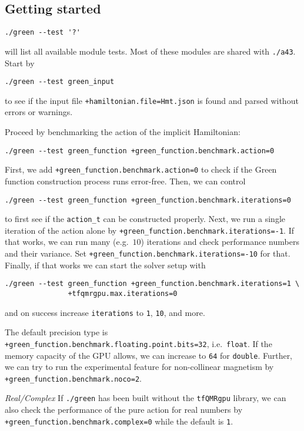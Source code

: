 \documentclass[oribibl]{llncs}
\newcommand{\ttt}[1]{\texttt{#1}}
\begin{document}
\subsection{Getting started} \label{sec:green-getting-started}
%
\begin{verbatim}
./green --test '?'
\end{verbatim}
will list all available module tests. Most of these modules are shared with \ttt{./a43}.
Start by
\begin{verbatim}
./green --test green_input
\end{verbatim}
to see if the input file \ttt{+hamiltonian.file=Hmt.json} is found and parsed without errors or warnings.

%
\noindent
Proceed by benchmarking the action of the implicit Hamiltonian:
\begin{verbatim}
./green --test green_function +green_function.benchmark.action=0
\end{verbatim}
First, we add \ttt{+green\_function.benchmark.action=0} to check if the Green function construction process runs error-free.
Then, we can control 
\begin{verbatim}
./green --test green_function +green_function.benchmark.iterations=0
\end{verbatim}
to first see if the \ttt{action\_t} can be constructed properly.
Next, we run a single iteration of the action alone by \ttt{+green\_function.benchmark.iterations=-1}.
If that works, we can run many (e.g.~$10$) iterations and check performance numbers and their variance.
Set \ttt{+green\_function.benchmark.iterations=-10} for that.
\noindent
Finally, if that works we can start the solver setup with 
\begin{verbatim}
./green --test green_function +green_function.benchmark.iterations=1 \
			   +tfqmrgpu.max.iterations=0
\end{verbatim}
and on success increase \ttt{iterations} to \ttt{1}, \ttt{10}, and more.

%
\noindent
The default precision type is \ttt{+green\_function.benchmark.floating.point.bits=32}, i.e.~\ttt{float}.
If the memory capacity of the \ac{GPU} allows, we can increase to \ttt{64} for \ttt{double}.
Further, we can try to run the experimental feature for non-collinear magnetism by \ttt{+green\_function.benchmark.noco=2}.

%
\noindent
\emph{Real/Complex} If \ttt{./green} has been built without the \ttt{tfQMRgpu} library, we can also check the performance of the pure action for real numbers by \ttt{+green\_function.benchmark.complex=0} while the default is \ttt{1}.
\end{document}

